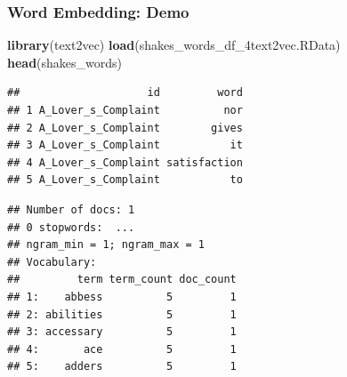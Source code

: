 \documentclass[
  shownotes,
  xcolor={svgnames},
  hyperref={colorlinks,citecolor=DarkBlue,linkcolor=DarkRed,urlcolor=DarkBlue}
  , aspectratio=169]{beamer}
\newenvironment{Shaded}{\begin{snugshade}}{\end{snugshade}}
\newcommand{\DataTypeTok}[1]{\textcolor[rgb]{0.13,0.29,0.53}{#1}}
\newcommand{\DecValTok}[1]{\textcolor[rgb]{0.00,0.00,0.81}{#1}}
\newcommand{\KeywordTok}[1]{\textcolor[rgb]{0.13,0.29,0.53}{\textbf{#1}}}
\newcommand{\NormalTok}[1]{#1}
\newcommand{\OperatorTok}[1]{\textcolor[rgb]{0.81,0.36,0.00}{\textbf{#1}}}
\newcommand{\OtherTok}[1]{\textcolor[rgb]{0.56,0.35,0.01}{#1}}
\newcommand{\StringTok}[1]{\textcolor[rgb]{0.31,0.60,0.02}{#1}}
\begin{document}
\begin{frame}[fragile]
\frametitle{Word Embedding: Demo }


\begin{scriptsize}

\begin{Shaded}
\begin{Highlighting}[]
\KeywordTok{library}\NormalTok{(text2vec)}
\KeywordTok{load}\NormalTok{(}\StringTok{\textquotesingle{}shakes\_words\_df\_4text2vec.RData\textquotesingle{}}\NormalTok{)}
\KeywordTok{head}\NormalTok{(shakes\_words)}
\end{Highlighting}
\end{Shaded}

\end{scriptsize}
\begin{tiny}


\begin{verbatim}
##                    id         word
## 1 A_Lover_s_Complaint          nor
## 2 A_Lover_s_Complaint        gives
## 3 A_Lover_s_Complaint           it
## 4 A_Lover_s_Complaint satisfaction
## 5 A_Lover_s_Complaint           to
\end{verbatim}
\end{tiny}

\begin{scriptsize}

\begin{Shaded}
\end{Shaded}

\end{scriptsize}
\begin{tiny}


\begin{verbatim}
## Number of docs: 1 
## 0 stopwords:  ... 
## ngram_min = 1; ngram_max = 1 
## Vocabulary: 
##         term term_count doc_count
## 1:    abbess          5         1
## 2: abilities          5         1
## 3: accessary          5         1
## 4:       ace          5         1
## 5:    adders          5         1
\end{verbatim}
\end{tiny}

\end{frame}
\end{document}
